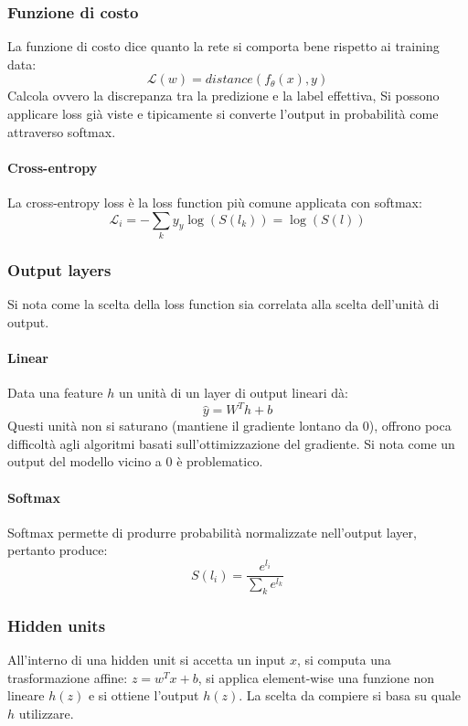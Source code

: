 		\subsubsection{Funzione di costo}
		La funzione di costo dice quanto la rete si comporta bene rispetto ai training data:
		$$\mathcal{L}(w) = distance(f_\theta(x), y)$$
		Calcola ovvero la discrepanza tra la predizione e la label effettiva,
		Si possono applicare loss gi\`a viste e tipicamente si converte l'output in probabilit\`a come attraverso softmax.

			\paragraph{Cross-entropy}
			La cross-entropy loss \`e la loss function pi\`u comune applicata con softmax:
			$$\mathcal{L}_i = -\sum\limits_ky_y\log(S(l_k)) = \log(S(l))$$

		\subsubsection{Output layers}
		Si nota come la scelta della loss function sia correlata alla scelta dell'unit\`a di output.

			\paragraph{Linear}
			Data una feature $h$ un unit\`a di un layer di output lineari d\`a:
			$$\hat{y} = W^Th+b$$
			Questi unit\`a non si saturano (mantiene il gradiente lontano da $0$), offrono poca difficolt\`a agli algoritmi basati sull'ottimizzazione del gradiente.
			Si nota come un output del modello vicino a $0$ \`e problematico.

			\paragraph{Softmax}
			Softmax permette di produrre probabilit\`a normalizzate nell'output layer, pertanto produce:
			$$S(l_i) = \frac{e^{l_i}}{\sum\limits_ke^{l_k}}$$

		\subsubsection{Hidden units}
		All'interno di una hidden unit si accetta un input $x$, si computa una trasformazione affine: $z = w^Tx+b$, si applica element-wise una funzione non lineare $h(z)$ e si ottiene l'output $h(z)$.
		La scelta da compiere si basa su quale $h$ utilizzare.

